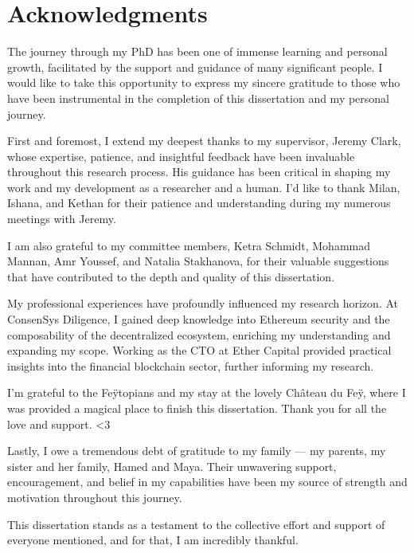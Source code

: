 
\chapter*{Acknowledgments}

The journey through my PhD has been one of immense learning and personal growth, facilitated by the support and guidance of many significant people. I would like to take this opportunity to express my sincere gratitude to those who have been instrumental in the completion of this dissertation and my personal journey.
 \vspace{0.5cm} 

First and foremost, I extend my deepest thanks to my supervisor, Jeremy Clark, whose expertise, patience, and insightful feedback have been invaluable throughout this research process. His guidance has been critical in shaping my work and my development as a researcher and a human. I'd like to thank Milan, Ishana, and Kethan for their patience and understanding during my numerous meetings with Jeremy.  
 \vspace{0.5cm} 

I am also grateful to my committee members, Ketra Schmidt, Mohammad Mannan, Amr Youssef, and Natalia Stakhanova, for their valuable suggestions that have contributed to the depth and quality of this dissertation. 
 \vspace{0.5cm} 

My professional experiences have profoundly influenced my research horizon. At ConsenSys Diligence, I gained deep knowledge into Ethereum security and the composability of the decentralized ecosystem, enriching my understanding and expanding my scope. Working as the CTO at Ether Capital provided practical insights into the financial blockchain sector, further informing my research. 
 \vspace{0.5cm} 

I'm grateful to the Fe\"ytopians and my stay at the lovely Ch\^ateau du Fe\"y, where I was provided a magical place to finish this dissertation. Thank you for all the love and support. \textless3 
 \vspace{0.5cm} 

Lastly, I owe a tremendous debt of gratitude to my family — my parents, my sister and her family, Hamed and Maya. Their unwavering support, encouragement, and belief in my capabilities have been my source of strength and motivation throughout this journey.
 \vspace{0.5cm} 

This dissertation stands as a testament to the collective effort and support of everyone mentioned, and for that, I am incredibly thankful.



